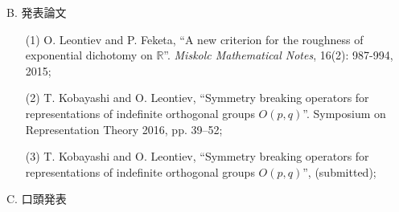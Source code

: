 \documentclass[a4j,twocolumn]{jarticle}
\begin{document}
\vspace{0.2cm}


\noindent
B. 発表論文
\begin{enumerate}
	\item[(1)] O. Leontiev and P. Feketa, ``A new criterion for the roughness of exponential dichotomy on $\mathbb{R}$''. {\it
		Miskolc Mathematical Notes}, 16(2): 987-994, 2015;
	\item[(2)] T. Kobayashi and O. Leontiev, ``Symmetry breaking operators for representations of indefinite orthogonal groups $O(p,q)$''. Symposium on Representation Theory 2016, pp. 39--52;
	\item[(3)] T. Kobayashi and O. Leontiev, ``Symmetry breaking operators for representations of indefinite orthogonal groups $O(p,q)$'', (submitted);
\end{enumerate}

\vspace{0.1cm}


\vspace{0.2cm}
\noindent
C. 口頭発表
\end{document}
